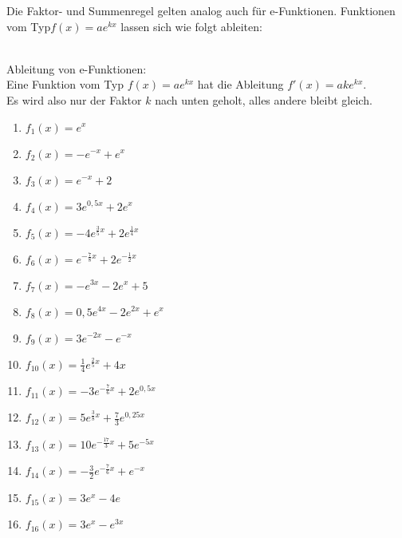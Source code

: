 Die Faktor- und Summenregel gelten analog auch für e-Funktionen. Funktionen vom Typ\linebreak \(f(x)=ae^{kx}\) lassen sich wie folgt ableiten:
\begin{tcolorbox}
	\phantom{text}\\
	\textcolor{loestc}{Ableitung von e-Funktionen:\\
		Eine Funktion vom Typ \(f(x)=ae^{kx}\) hat die Ableitung \(f'(x)=ake^{kx}\).\\
		Es wird also nur der Faktor \(k\) nach unten geholt, alles andere bleibt gleich.}\\
\end{tcolorbox}
\begin{minipage}{\textwidth}
	\begin{Exercise}[title={\raggedright Berechne jeweils allgemein die Ableitung \(f'(x)\)}, label=summenregelA1]
		\begin{minipage}{\textwidth}
			\begin{minipage}{0.49\textwidth}
				\begin{enumerate}[label=\alph*)]
					\item \(f_1(x)=e^x\)
					\item \(f_2(x)=-e^{-x}+e^x\)
					\item \(f_3(x)=e^{-x}+2\)
					\item \(f_4(x)=3e^{0,5x}+2e^x\)
					\item \(f_5(x)=-4e^{\frac{3}{5}x}+2e^{\frac{1}{4}x}\)
					\item \(f_6(x)=e^{-\frac{7}{8}x}+2e^{-\frac{1}{2}x}\)
					\item \(f_7(x)=-e^{3x}-2e^{x}+5\)
					\item \(f_8(x)=0,5e^{4x}-2e^{2x}+e^x\)
				\end{enumerate}
			\end{minipage}
			\begin{minipage}{0.49\textwidth}
				\begin{enumerate}[label=\alph*)]
					\setcounter{enumi}{8}
					\item \(f_9(x)=3e^{-2x}-e^{-x}\)
					\item \(f_{10}(x)=\frac{1}{4}e^{\frac{2}{5}x}+4x\)
					\item \(f_{11}(x)=-3e^{-\frac{7}{6}x}+2e^{0,5x}\)
					\item \(f_{12}(x)=5e^{\frac{3}{8}x}+\frac{7}{3}e^{0,25x}\)
					\item \(f_{13}(x)=10e^{-\frac{17}{3}x}+5e^{-5x}\)
					\item \(f_{14}(x)=-\frac{3}{2}e^{-\frac{7}{6}x}+e^{-x}\)
					\item \(f_{15}(x)=3e^x-4e\)
					\item \(f_{16}(x)=3e^x-e^{3x}\)
				\end{enumerate}
			\end{minipage}
		\end{minipage}
	\end{Exercise}
\end{minipage}
